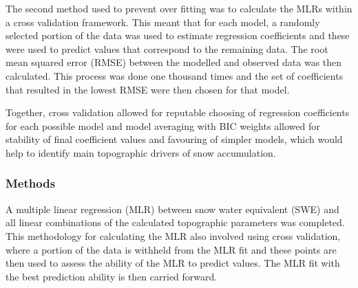 \documentclass[12pt]{article}
\begin{document}
The second method used to prevent over fitting was to calculate the MLRs within a cross validation framework. This meant that for each model, a randomly selected portion of the data was used to estimate regression coefficients and these were used to predict values that correspond to the remaining data. The root mean squared error (RMSE) between the modelled and observed data was then calculated. This process was done one thousand times and the set of coefficients that resulted in the lowest RMSE were then chosen for that model. 

Together, cross validation allowed for reputable choosing of regression coefficients for each possible model and model averaging with BIC weights allowed for stability of final coefficient values and favouring of simpler models, which would help to identify main topographic drivers of snow accumulation. 

\subsubsection{Methods}
\label{sec:MLRMethods}

A multiple linear regression (MLR) between snow water equivalent (SWE) and all linear combinations of the calculated topographic parameters was completed. This methodology for calculating the MLR also involved using cross validation, where a portion of the data is withheld from the MLR fit and these points are then used to assess the ability of the MLR to predict values. The MLR fit with the best prediction ability is then carried forward. 
\end{document}
